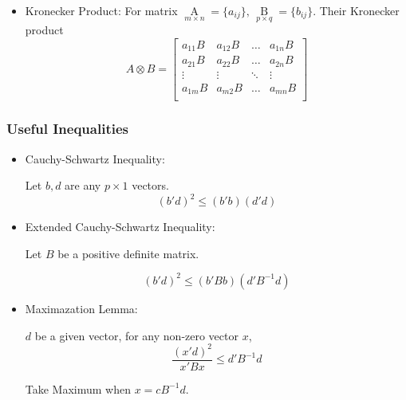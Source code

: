 \begin{itemize}[topsep=6pt,itemsep=4pt]
        
        \item Kronecker Product: For matrix $ \mathop{A}\limits_{m\times n}=\{a_{ij}\},\,\mathop{B}\limits_{p\times q}=\{b_{ij}\} $. Their Kronecker product
        \begin{equation}
            A\otimes B=\begin{bmatrix}
            a_{11}B&a_{12}B&\ldots&a_{1n}B \\
            a_{21}B&a_{22}B&\ldots&a_{2n}B \\
            \vdots&\vdots&\ddots&\vdots\\
            a_{1m}B&a_{m2}B&\ldots&a_{mn}B \\
            \end{bmatrix} 
        \end{equation}
        
    \end{itemize}
    
        


    \subsubsection{Useful Inequalities}
    \begin{itemize}[topsep=6pt,itemsep=4pt]
        \item Cauchy-Schwartz Inequality:
        
        Let $ b,d$ are any $ p\times 1 $ vectors.
        \begin{equation}
            (b'd)^2\leq (b'b)(d'd) 
        \end{equation}
        
        \item Extended Cauchy-Schwartz Inequality: 
        
        Let $ B $ be a positive definite matrix.
        
        \begin{equation}
            (b'd)^2\leq(b'Bb)(d'B^{-1}d) 
        \end{equation}
        
        \item Maximazation Lemma:
        
        $ d $ be a given vector, for any non-zero vector $ x $,
        \begin{equation}
            \dfrac{(x'd)^2}{x'Bx}\leq d'B^{-1}d 
        \end{equation}

        Take Maximum when $ x=cB^{-1}d $.
        
        
    \end{itemize}

